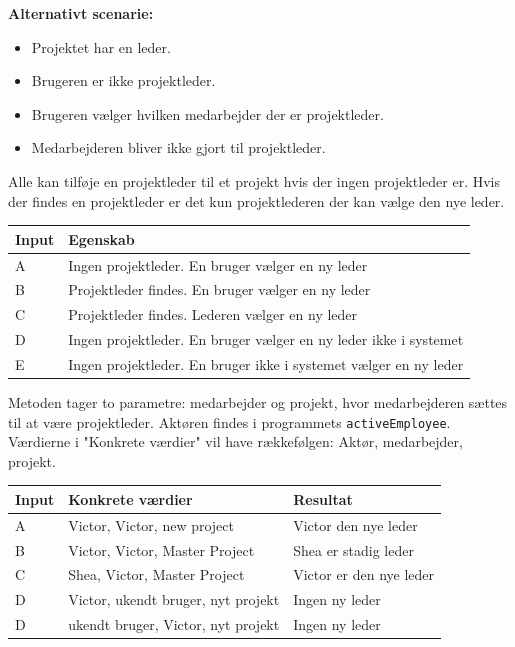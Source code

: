\textbf{Alternativt scenarie:}
\begin{itemize}
    \item Projektet har en leder.
    \item Brugeren er ikke projektleder.
    \item Brugeren vælger hvilken medarbejder der er projektleder.
    \item Medarbejderen bliver ikke gjort til projektleder.
\end{itemize}

\vspace{1 cm}

Alle kan tilføje en projektleder til et projekt hvis der ingen projektleder er. Hvis der findes en projektleder er det kun projektlederen der kan vælge den nye leder.

\begin{table}[H]
    \centering
    \begin{tabular}{|l|l|}
    \hline
    \textbf{Input} & \textbf{Egenskab}                                                            \\ \hline
    A     & Ingen projektleder. En bruger vælger en ny leder                    \\ \hline
    B     & Projektleder findes. En bruger vælger en ny leder                   \\ \hline
    C     & Projektleder findes. Lederen vælger en ny leder                     \\ \hline
    D     & Ingen projektleder. En bruger vælger en ny leder ikke i systemet    \\ \hline
    E     & Ingen projektleder. En bruger ikke i systemet vælger en ny leder    \\ \hline
    \end{tabular}
\end{table}

Metoden tager to parametre: medarbejder og projekt, hvor medarbejderen sættes til at være projektleder. Aktøren findes i programmets \texttt{activeEmployee}. Værdierne i "Konkrete værdier" vil have rækkefølgen: Aktør, medarbejder, projekt.

\begin{table}[H]
    \centering
    \begin{tabular}{|l|l|l|}
    \hline
    \textbf{Input} &     \textbf{Konkrete værdier} & \textbf{Resultat}                             \\ \hline
    A     & Victor, Victor, new project     & Victor den nye leder      \\ \hline
    B     & Victor, Victor, Master Project  & Shea er stadig leder      \\ \hline
    C     & Shea, Victor, Master Project    & Victor er den nye leder   \\ \hline
    D     & Victor, ukendt bruger, nyt projekt    & Ingen ny leder      \\ \hline
    D     & ukendt bruger, Victor, nyt projekt    & Ingen ny leder      \\ \hline

    \end{tabular}
    
\end{table}

